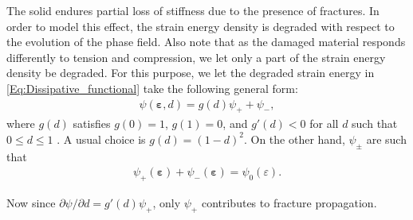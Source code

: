 \begin{remark}
The solid endures partial loss of stiffness due to the presence of fractures. In order to model this {effect}, the strain energy density is degraded with respect to the evolution of {the} phase field. Also note that as the damaged material responds differently to tension and compression, we let only a part of the strain energy density be degraded. For this purpose, we let the degraded strain energy in \eqref{Eq:Dissipative_functional} take the following general form:
\begin{equation}\label{Eq:psi}
\begin{aligned}
\psi(\bm{\varepsilon}, d) = g(d)\psi_+ + \psi_-,
\end{aligned}
\end{equation}
where $g(d)$ satisfies $g(0)=1$, $g(1)=0$, and $g'(d)<0$ for all $d$ such that $0\le d\le 1$ \cite{Bourdin2000797}. A usual choice is $g(d)=(1-d)^2$. On the other hand, $\psi_{\pm}$ are such that
\begin{equation*}
    \begin{aligned}
        \psi_+(\bm{\varepsilon})+\psi_-(\bm{\varepsilon})=\psi_0(\varepsilon).
    \end{aligned}
\end{equation*}

Now since $\partial\psi/\partial d=g'(d)\psi_+$, only $\psi_+$ contributes to fracture propagation. 
\end{remark}



